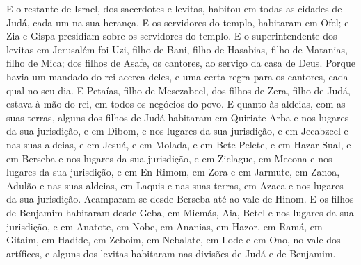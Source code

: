 E o restante de Israel, dos sacerdotes e levitas, habitou em
todas as cidades de Judá, cada um na sua herança. E os
servidores do templo, habitaram em Ofel; e Zia e Gispa presidiam
sobre os servidores do templo. E o superintendente dos
levitas em Jerusalém foi Uzi, filho de Bani, filho de Hasabias,
filho de Matanias, filho de Mica; dos filhos de Asafe, os cantores,
ao serviço da casa de Deus. Porque havia um mandado do rei
acerca deles, e uma certa regra para os cantores, cada qual no seu
dia. E Petaías, filho de Mesezabeel, dos filhos de Zera,
filho de Judá, estava à mão do rei, em todos os negócios do povo.
E quanto às aldeias, com as suas terras, alguns dos filhos de
Judá habitaram em Quiriate-Arba e nos lugares da sua jurisdição, e
em Dibom, e nos lugares da sua jurisdição, e em Jecabzeel e nas suas
aldeias, e em Jesuá, e em Molada, e em Bete-Pelete, e
em Hazar-Sual, e em Berseba e nos lugares da sua jurisdição,
e em Ziclague, em Mecona e nos lugares da sua jurisdição,
e em En-Rimom, em Zora e em Jarmute, em Zanoa, Adulão
e nas suas aldeias, em Laquis e nas suas terras, em Azaca e nos
lugares da sua jurisdição. Acamparam-se desde Berseba até ao vale de
Hinom. E os filhos de Benjamim habitaram desde Geba, em
Micmás, Aia, Betel e nos lugares da sua jurisdição, e em
Anatote, em Nobe, em Ananias, em Hazor, em Ramá, em Gitaim,
em Hadide, em Zeboim, em Nebalate, em Lode e em Ono,
no vale dos artífices, e alguns dos levitas habitaram nas
divisões de Judá e de Benjamim.

\medskip

